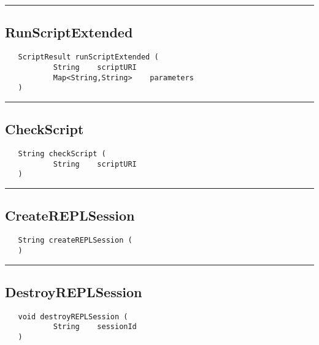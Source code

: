 \rule{15cm}{2pt}
\subsection{RunScriptExtended}
\label{Api:RunScriptExtended}
\begin{verbatim}
   ScriptResult runScriptExtended (
           String    scriptURI
           Map<String,String>    parameters
   )
\end{verbatim}



\rule{15cm}{2pt}
\subsection{CheckScript}
\label{Api:CheckScript}
\begin{verbatim}
   String checkScript (
           String    scriptURI
   )
\end{verbatim}



\rule{15cm}{2pt}
\subsection{CreateREPLSession}
\label{Api:CreateREPLSession}
\begin{verbatim}
   String createREPLSession (
   )
\end{verbatim}



\rule{15cm}{2pt}
\subsection{DestroyREPLSession}
\label{Api:DestroyREPLSession}
\begin{verbatim}
   void destroyREPLSession (
           String    sessionId
   )
\end{verbatim}




